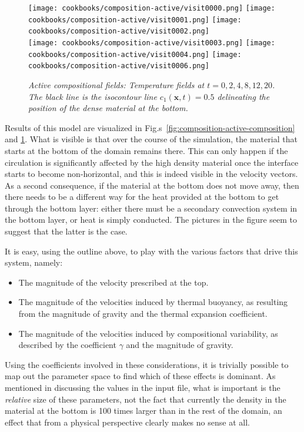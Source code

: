 \documentclass{article}
\begin{document}
\begin{figure}
  \centering
  \texttt{[image: cookbooks/composition-active/visit0000.png]}
  \hfill
  \texttt{[image: cookbooks/composition-active/visit0001.png]}
  \hfill
  \texttt{[image: cookbooks/composition-active/visit0002.png]}
  \\[6pt]
  \texttt{[image: cookbooks/composition-active/visit0003.png]}
  \hfill
  \texttt{[image: cookbooks/composition-active/visit0004.png]}
  \hfill
  \texttt{[image: cookbooks/composition-active/visit0006.png]}
  \caption{\it Active compositional fields: Temperature fields at $t=0, 2, 4, 8,
  12, 20$. The black line is the isocontour line $c_1(\mathbf x,t)=0.5$
    delineating the position of the dense material at the bottom.}
  \label{fig:composition-active-temperature}
\end{figure}

Results of this model are visualized in
Fig.s~\ref{fig:composition-active-composition} and \ref{fig:composition-active-temperature}. What is visible is
that over the course of the simulation, the material that starts at the bottom
of the domain remains there. This can only happen if the circulation is
significantly affected by the high density material once the interface starts
to become non-horizontal, and this is
indeed visible in the velocity vectors. As a second consequence, if the
material at the bottom does not move away, then there needs to be a different
way for the heat provided at the bottom to get through the bottom layer:
either there must be a secondary convection system in the bottom layer, or
heat is simply conducted. The pictures in the figure seem to suggest
that the latter is the case.

It is easy, using the
outline above, to play with the various factors that drive this system, namely:
\begin{itemize}
  \item The magnitude of the velocity prescribed at the top.
  \item The magnitude of the velocities induced by thermal buoyancy, as
  resulting from the magnitude of gravity and the thermal expansion coefficient.
  \item The magnitude of the velocities induced by compositional variability, as
  described by the coefficient $\gamma$ and the magnitude of gravity.
\end{itemize}
Using the coefficients involved in these considerations, it is trivially
possible to map out the parameter space to find which of these effects is
dominant. As mentioned in discussing the values in the input file, what is
important is the \textit{relative} size of these parameters, not the fact
that currently the density in the material at the bottom is 100 times larger
than in the rest of the domain, an effect that from a physical perspective
clearly makes no sense at all.
\end{document}
